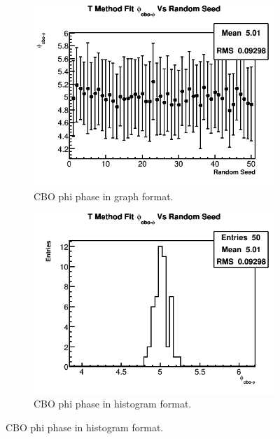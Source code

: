 	\begin{figure}[]
	\centering
	    \begin{subfigure}[t]{0.45\textwidth}
		    \centering
			\includegraphics[width=\textwidth]{TMethod_phi_cbo-phi_Vs_Iter_Canv}
		    \caption{CBO phi phase in graph format.}
	    \end{subfigure}
	    \hspace{4mm}
	    \begin{subfigure}[t]{0.45\textwidth}
		    \centering
			\includegraphics[width=\textwidth]{TMethod_phi_cbo-phi_Vs_Iter_Canv_hist}
		    \caption{CBO phi phase in histogram format.}
	    \end{subfigure}%

\end{figure}
